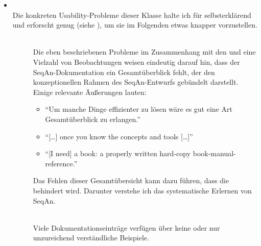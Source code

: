 \begin{itemize}
  \item[\codebullet{apiua://code/-9223372036854775404}] \textbf{} \\
  Die konkreten Usability-Probleme dieser Klasse halte ich für selbsterklärend und erforscht genug (siehe ), um sie im Folgenden etwas knapper vorzustellen.
  
  \begin{description}
    \item[] \textbf{} \\
    Die eben beschriebenen Probleme im Zusammenhang mit den  und eine Vielzahl von Beobachtungen weisen eindeutig darauf hin, dass der SeqAn-Dokumentation ein Gesamtüberblick fehlt, der den konzeptionellen Rahmen des SeqAn-Entwurfs gebündelt darstellt. Einige relevante Äußerungen lauten:
    \begin{itemize}
      \item ``Um manche Dinge effizienter zu lösen wäre es gut eine Art Gesamtüberblick zu erlangen.''
      \item ``[\ldots] once you know the concepts and tools [\ldots]''
      \item ``[I need] a book: a properly written hard-copy book-manual-reference.''
    \end{itemize}
  
    Das Fehlen dieser Gesamtübersicht kann dazu führen, dass die   behindert wird. Darunter verstehe ich das systematische Erlernen von SeqAn.
    
    \item[] \textbf{} \\
    Viele Dokumentationseinträge verfügen über keine oder nur unzureichend verständliche Beispiele.
    

\end{description}
\end{itemize}
